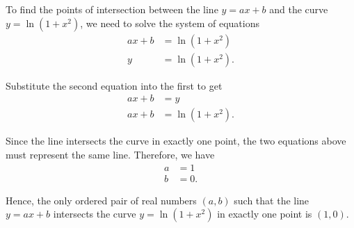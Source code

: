 To find the points of intersection between the line $y = ax + b$ and the curve $y = \ln(1+x^2)$, we need to solve the system of equations
\begin{align*}
ax + b &= \ln(1+x^2) \\
y &= \ln(1+x^2).
\end{align*}

Substitute the second equation into the first to get
\begin{align*}
ax + b &= y \\
ax + b &= \ln(1+x^2).
\end{align*}

Since the line intersects the curve in exactly one point, the two equations above must represent the same line. Therefore, we have
\begin{align*}
a &= 1 \\
b &= 0.
\end{align*}

Hence, the only ordered pair of real numbers $(a,b)$ such that the line $y = ax + b$ intersects the curve $y = \ln(1+x^2)$ in exactly one point is $(1,0)$.
